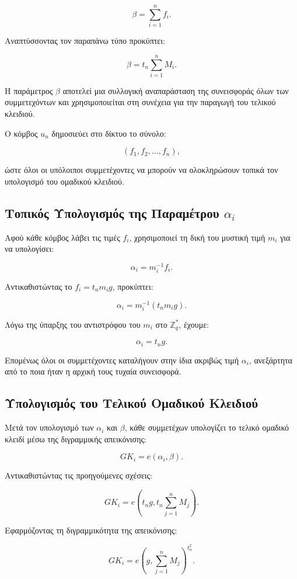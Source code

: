 \documentclass[12pt,a4paper]{report}
\begin{document}
\[
\beta=
\sum_{i=1}^{n} f_i.
\]

Αναπτύσσοντας τον παραπάνω τύπο προκύπτει:

\[
\beta
=
t_n
\sum_{i=1}^{n} M_i.
\]

Η παράμετρος \(\beta\) αποτελεί μια συλλογική αναπαράσταση της συνεισφοράς όλων των συμμετεχόντων και χρησιμοποιείται στη συνέχεια για την παραγωγή του τελικού κλειδιού.

Ο κόμβος \(u_n\) δημοσιεύει στο δίκτυο το σύνολο:

\[
(f_1,f_2,\ldots,f_n),
\]

ώστε όλοι οι υπόλοιποι συμμετέχοντες να μπορούν να ολοκληρώσουν τοπικά τον υπολογισμό του ομαδικού κλειδιού.

\subsection{Τοπικός Υπολογισμός της Παραμέτρου \(\alpha_i\)}

Αφού κάθε κόμβος λάβει τις τιμές \(f_i\), χρησιμοποιεί τη δική του μυστική τιμή \(m_i\) για να υπολογίσει:

\[
\alpha_i
=
m_i^{-1}f_i.
\]

Αντικαθιστώντας το \(f_i=t_nm_i g\), προκύπτει:

\[
\alpha_i
=
m_i^{-1}(t_nm_ig).
\]

Λόγω της ύπαρξης του αντιστρόφου του \(m_i\) στο \(\mathbb{Z}_q^{*}\), έχουμε:

\[
\alpha_i=t_ng.
\]

Επομένως όλοι οι συμμετέχοντες καταλήγουν στην ίδια ακριβώς τιμή \(\alpha_i\), ανεξάρτητα από το ποια ήταν η αρχική τους τυχαία συνεισφορά.

\subsection{Υπολογισμός του Τελικού Ομαδικού Κλειδιού}

Μετά τον υπολογισμό των \(\alpha_i\) και \(\beta\), κάθε συμμετέχων υπολογίζει το τελικό ομαδικό κλειδί μέσω της διγραμμικής απεικόνισης:

\[
GK_i=e(\alpha_i,\beta).
\]

Αντικαθιστώντας τις προηγούμενες σχέσεις:

\[
GK_i
=
e
\left(
t_ng,
t_n
\sum_{j=1}^{n}M_j
\right).
\]

Εφαρμόζοντας τη διγραμμικότητα της απεικόνισης:

\[
GK_i
=
e
\left(
g,
\sum_{j=1}^{n}M_j
\right)^{t_n^2}.
\]
\end{document}
